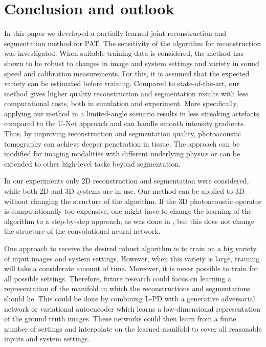 \documentclass[journal]{IEEEtran}
\begin{document}
\section{Conclusion and outlook}\label{sec:conclusion}
In this paper we developed a partially learned joint reconstruction and segmentation method for PAT. The sensitivity of the algorithm for reconstruction was investigated. {When suitable training data is considered, the method has shown to be robust to changes in image and system settings and variety in sound speed and calibration measurements. For this, it is assumed that the expected variety can be estimated before training.} Compared to state-of-the-art, our method gives higher quality reconstruction and segmentation results with less computational costs, {both in simulation and experiment}. More specifically, applying our method in a limited-angle scenario results in less streaking artefacts compared to the U-Net approach and can handle smooth intensity gradients. Thus, by improving reconstruction and segmentation quality, photoacoustic tomography can achieve deeper penetration in tissue. The approach can be modified for imaging modalities with different underlying physics or can be extended to other high-level tasks beyond segmentation.

In our experiments only 2D reconstruction and segmentation were considered, while both 2D \cite{Li2018} and 3D systems \cite{Toi2017} are in use. Our method can be applied to 3D without changing the structure of the algorithm. If the 3D photoacoustic operator is computationally too expensive, one might have to change the learning of the algorithm to a step-by-step approach, as was done in \cite{Hauptmann2018}, but this does not change the structure of the convolutional neural network.

One approach to receive the desired robust algorithm is to train on a big variety of input images and system settings. However, when this variety is large, training will take a considerate amount of time. Moreover, it is never possible to train for all possible settings. Therefore, future research could focus on learning a representation of the manifold in which the reconstructions and segmentations should lie. This could be done by combining L-PD with a generative adversarial network \cite{Goodfellow2014} or variational autoencoder \cite{Kingma2013} which learns a low-dimensional representation of the ground truth images. These networks could then learn from a finite number of settings and interpolate on the learned manifold to cover all reasonable inputs and system settings. 
\end{document}
